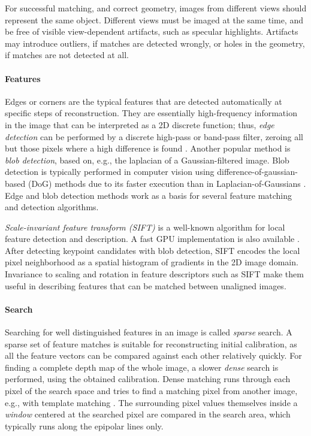 For successful matching, and correct geometry, images from different views should represent the same object.
Different views must be imaged at the same time, and be free of visible view-dependent artifacts, such as specular highlights.
Artifacts may introduce outliers, if matches are detected wrongly, or holes in the geometry, if matches are not detected at all.

\paragraph{Features}
Edges or corners are the typical features that are detected automatically at specific steps of reconstruction.
They are essentially high-frequency information in the image that can be interpreted as a 2D discrete function;
thus, \emph{edge detection} can be performed by a discrete high-pass or band-pass filter, zeroing all but those pixels where a high difference is found \cite{marr1980theory}.
Another popular method is \emph{blob detection}, based on, e.g., the laplacian of a Gaussian-filtered image.
Blob detection is typically performed in computer vision using difference-of-gaussian-based (DoG) methods due to its faster execution than in Laplacian-of-Gaussians \cite[p. 152]{szeliski10vision}.
Edge and blob detection methods work as a basis for several feature matching and detection algorithms. %

\emph{Scale-invariant feature transform (SIFT)} \cite{lowe1999object} is a well-known algorithm for local feature detection and description.
A fast GPU implementation is also available \cite{changchang2007siftgpu}.
After detecting keypoint candidates with blob detection, SIFT encodes the local pixel neighborhood as a spatial histogram of gradients in the 2D image domain.
Invariance to scaling and rotation in feature descriptors such as SIFT make them useful in describing features that can be matched between unaligned images.

\paragraph{Search}
Searching for well distinguished features in an image is called \emph{sparse} search.
A sparse set of feature matches is suitable for reconstructing initial calibration, as all the feature vectors can be compared against each other relatively quickly.
For finding a complete depth map of the whole image, a slower \emph{dense} search is performed, using the obtained calibration.
Dense matching runs through each pixel of the search space and tries to find a matching pixel from another image, e.g., with template matching \cite{duda1973pattern}.
The surrounding pixel values themselves inside a \emph{window} centered at the searched pixel are compared in the search area, which typically runs along the epipolar lines only.

